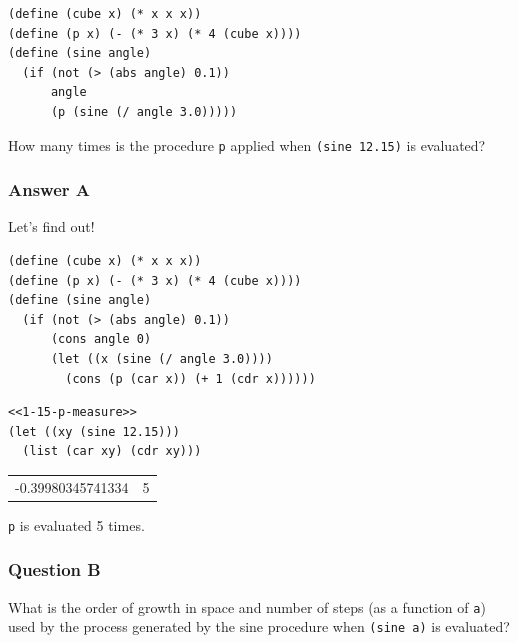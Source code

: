 \documentclass[final,fleqn,titlepage,twoside]{article}
\begin{document}
\begin{verbatim}
(define (cube x) (* x x x))
(define (p x) (- (* 3 x) (* 4 (cube x))))
(define (sine angle)
  (if (not (> (abs angle) 0.1))
      angle
      (p (sine (/ angle 3.0)))))
\end{verbatim}

How many times is the procedure \texttt{p} applied when \texttt{(sine 12.15)} is evaluated?

\subsubsection{Answer A}
\label{sec:org9c63737}
Let's find out!
\begin{verbatim}
(define (cube x) (* x x x))
(define (p x) (- (* 3 x) (* 4 (cube x))))
(define (sine angle)
  (if (not (> (abs angle) 0.1))
      (cons angle 0)
      (let ((x (sine (/ angle 3.0))))
        (cons (p (car x)) (+ 1 (cdr x))))))
\end{verbatim}

\begin{verbatim}
<<1-15-p-measure>>
(let ((xy (sine 12.15)))
  (list (car xy) (cdr xy)))
\end{verbatim}

\begin{center}
\begin{tabular}{rr}
-0.39980345741334 & 5\\[0pt]
\end{tabular}
\end{center}

\texttt{p} is evaluated 5 times.

\subsubsection{Question B}
\label{sec:org609b176}
What is the order of growth in space and number of steps (as a function of
\texttt{a}) used by the process generated by the sine procedure when
\texttt{(sine a)} is evaluated?
\end{document}
